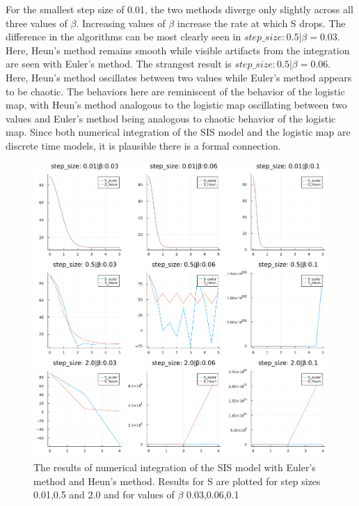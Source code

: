 For the smallest step size of 0.01, the two methods diverge only slightly across all three values of $\beta$. Increasing values of $\beta$ increase the rate at which S drops. The difference in the algorithms can be most clearly seen in $ step\_size: 0.5|\beta = 0.03$. Here, Heun's method remains smooth while visible artifacts from the integration are seen with Euler's method. The strangest result is $step\_size: 0.5|\beta = 0.06$. Here, Heun's method oscillates between two values while Euler's method appears to be chaotic. The behaviors here are reminiscent of the behavior of the logistic map, with Heun's method analogous to the logistic map oscillating between two values and Euler's method being analogous to chaotic behavior of the logistic map. Since both numerical integration of the SIS model and the logistic map are discrete time models, it is plausible there is a formal connection. 




\begin{figure}[h]
  \centering
  \includegraphics[width = \textwidth]{fig/euler_heun_comp.png}
  \caption {The results of numerical integration of the SIS model with Euler's method and Heun's method. Results for S are plotted for step sizes 0.01,0.5 and 2.0 and for values of $\beta$ 0.03,0.06,0.1}
  \label{fig:SIS_results}
\end{figure}




